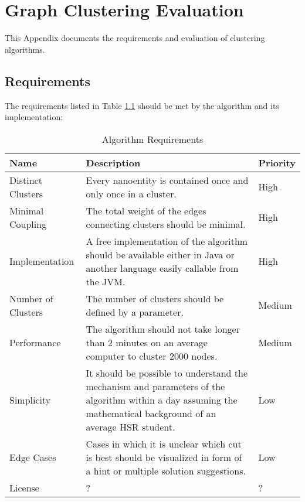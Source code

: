 \chapter{Graph Clustering Evaluation}
\label{appendix:graphClustering}
\label{appendix:graphClusteringAlgs}

This Appendix documents the requirements and evaluation of clustering algorithms. 

\section{Requirements}

The requirements listed in Table \ref{tab:requirementsAlgorithm} should be met by the algorithm and its implementation:

\begin{table}[H]
	\centering
	\caption{Algorithm Requirements}
	\label{tab:requirementsAlgorithm}
	\begin{tabular}{|p{100pt}|p{250pt}|p{50pt}|}
		\hline	
		Name & Description & Priority \\
		\hline
		Distinct Clusters & Every nanoentity is contained once and only once in a cluster. & High  \\
		\hline
		Minimal Coupling & The total weight of the edges connecting clusters should be minimal. & High \\
		\hline
		Implementation & A free implementation of the algorithm should be available either in Java or another language easily callable from the \gls{JVM}. & High  \\
		\hline
		Number of Clusters & The number of clusters should be defined by a parameter. & Medium \\
		\hline
		Performance & The algorithm should not take longer than 2 minutes on an average computer to cluster 2000 nodes.& Medium \\
		\hline
		Simplicity & It should be possible to understand the mechanism and parameters of the algorithm within a day assuming the mathematical background of an average \gls{HSR} student. & Low \\
		\hline
		Edge Cases & Cases in which it is unclear which cut is best should be visualized in form of a hint or multiple solution suggestions. & Low \\
		\hline
		License & ? & ? \\
		\hline
	\end{tabular}
\end{table}

